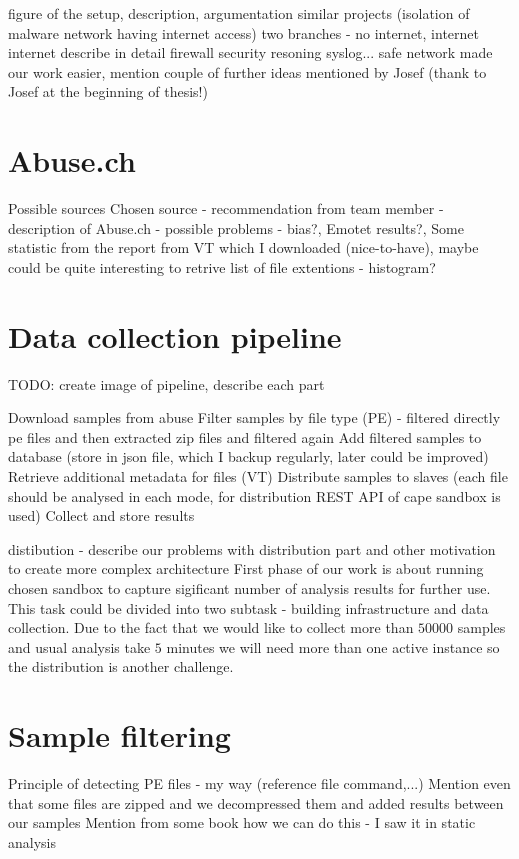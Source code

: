 figure of the setup, description, argumentation
similar projects (isolation of malware network having internet access)
two branches - no internet, internet
internet
    describe in detail
    firewall
    security resoning
    syslog...
safe network made our work easier, mention couple of further ideas mentioned by Josef (thank to Josef at the beginning of thesis!)

\section{Abuse.ch}
Possible sources
Chosen source
- recommendation from team member
- description of Abuse.ch
- possible problems - bias?, Emotet results?, Some statistic from the report from VT which I downloaded (nice-to-have), maybe could be quite interesting to retrive list of file extentions - histogram?


\section{Data collection pipeline}
TODO: create image of pipeline, describe each part

Download samples from abuse
Filter samples by file type (PE) - filtered directly pe files and then extracted zip files and filtered again
Add filtered samples to database (store in json file, which I backup regularly, later could be improved)
Retrieve additional metadata for files (VT)
Distribute samples to slaves (each file should be analysed in each mode, for distribution REST API of cape sandbox is used)
Collect and store results

distibution - describe our problems with distribution part and other motivation to create more complex architecture
First phase of our work is about running chosen sandbox to capture sigificant number of analysis results for further use. This task could be divided into two subtask - building infrastructure and data collection. Due to the fact that we would like to collect more than $50 000$ samples and usual analysis take $5$ minutes we will need more than one active instance so the distribution is another challenge.


\section{Sample filtering}
Principle of detecting PE files - my way (reference file command,...)
Mention even that some files are zipped and we decompressed them and added results between our samples
Mention from some book how we can do this - I saw it in static analysis

